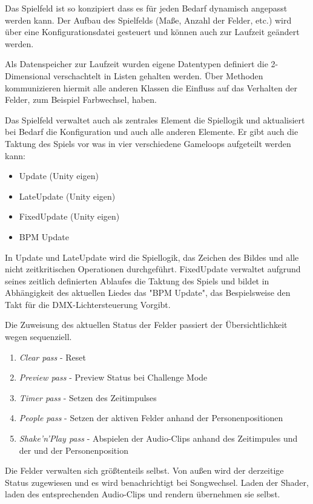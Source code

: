 
Das Spielfeld ist so konzipiert dass es für jeden Bedarf dynamisch angepasst werden kann. Der Aufbau des Spielfelds (Maße, Anzahl der Felder, etc.) wird über eine Konfigurationsdatei gesteuert und können auch zur Laufzeit geändert werden.

Als Datenspeicher zur Laufzeit wurden eigene Datentypen definiert die 2-Dimensional verschachtelt in Listen gehalten werden. Über Methoden kommunizieren hiermit alle anderen Klassen die Einfluss auf das Verhalten der Felder, zum Beispiel Farbwechsel, haben.

Das Spielfeld verwaltet auch als zentrales Element die Spiellogik und aktualisiert bei Bedarf die Konfiguration und auch alle anderen Elemente. Er gibt auch die Taktung des Spiels vor was in vier verschiedene Gameloops aufgeteilt werden kann:
\begin{itemize}
\item Update (Unity eigen)
\item LateUpdate (Unity eigen)
\item FixedUpdate (Unity eigen)
\item BPM Update
\end{itemize}

In Update und LateUpdate wird die Spiellogik, das Zeichen des Bildes und alle nicht zeitkritischen Operationen durchgeführt.
FixedUpdate verwaltet aufgrund seines zeitlich definierten Ablaufes die Taktung des Spiels und bildet in Abhängigkeit des aktuellen Liedes das "BPM Update", das Bespielsweise den Takt für die DMX-Lichtersteuerung Vorgibt.

Die Zuweisung des aktuellen Status der Felder passiert der Übersichtlichkeit wegen sequenziell.
\begin{enumerate}
\item \emph{Clear pass} - Reset
\item \emph{Preview pass} - Preview Status bei Challenge Mode
\item \emph{Timer pass} - Setzen des Zeitimpulses
\item \emph{People pass} - Setzen der aktiven Felder anhand der Personenpositionen
\item \emph{Shake'n'Play pass} - Abspielen der Audio-Clips anhand des Zeitimpules und der und der Personenposition
\end{enumerate}

Die Felder verwalten sich größtenteils selbst. Von außen wird der derzeitige Status zugewiesen und es wird benachrichtigt bei Songwechsel. Laden der Shader, laden des entsprechenden Audio-Clips und rendern übernehmen sie selbst.